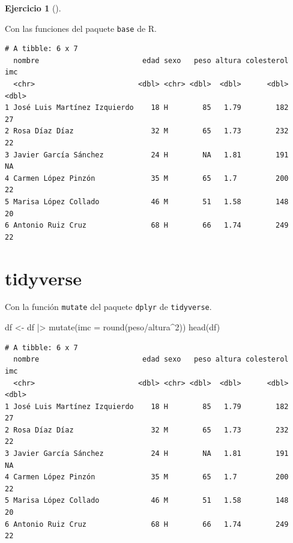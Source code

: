\documentclass[
  spanish,
  a4paper,
]{scrreport}
\newenvironment{Shaded}{\begin{snugshade}}{\end{snugshade}}
\newcommand{\AttributeTok}[1]{\textcolor[rgb]{0.40,0.45,0.13}{#1}}
\newcommand{\DecValTok}[1]{\textcolor[rgb]{0.68,0.00,0.00}{#1}}
\newcommand{\FunctionTok}[1]{\textcolor[rgb]{0.28,0.35,0.67}{#1}}
\newcommand{\NormalTok}[1]{\textcolor[rgb]{0.00,0.23,0.31}{#1}}
\newcommand{\OtherTok}[1]{\textcolor[rgb]{0.00,0.23,0.31}{#1}}
\newcommand{\SpecialCharTok}[1]{\textcolor[rgb]{0.37,0.37,0.37}{#1}}
\theoremstyle{definition}
\newtheorem{exercise}{Ejercicio}[chapter]
\theoremstyle{remark}
\begin{document}
\begin{exercise}[]
\begin{enumerate}
\begin{tcolorbox}
  Con las funciones del paquete \texttt{base} de R.

\begin{Shaded}
\end{Shaded}

\begin{verbatim}
# A tibble: 6 x 7
  nombre                        edad sexo   peso altura colesterol   imc
  <chr>                        <dbl> <chr> <dbl>  <dbl>      <dbl> <dbl>
1 José Luis Martínez Izquierdo    18 H        85   1.79        182    27
2 Rosa Díaz Díaz                  32 M        65   1.73        232    22
3 Javier García Sánchez           24 H        NA   1.81        191    NA
4 Carmen López Pinzón             35 M        65   1.7         200    22
5 Marisa López Collado            46 M        51   1.58        148    20
6 Antonio Ruiz Cruz               68 H        66   1.74        249    22
\end{verbatim}

  \section{tidyverse}

  Con la función \texttt{mutate} del paquete \texttt{dplyr} de
  \texttt{tidyverse}.

\begin{Shaded}
\begin{Highlighting}[]
\NormalTok{df }\OtherTok{\textless{}{-}}\NormalTok{ df }\SpecialCharTok{|\textgreater{}} \FunctionTok{mutate}\NormalTok{(}\AttributeTok{imc =} \FunctionTok{round}\NormalTok{(peso}\SpecialCharTok{/}\NormalTok{altura}\SpecialCharTok{\^{}}\DecValTok{2}\NormalTok{))}
\FunctionTok{head}\NormalTok{(df)}
\end{Highlighting}
\end{Shaded}

\begin{verbatim}
# A tibble: 6 x 7
  nombre                        edad sexo   peso altura colesterol   imc
  <chr>                        <dbl> <chr> <dbl>  <dbl>      <dbl> <dbl>
1 José Luis Martínez Izquierdo    18 H        85   1.79        182    27
2 Rosa Díaz Díaz                  32 M        65   1.73        232    22
3 Javier García Sánchez           24 H        NA   1.81        191    NA
4 Carmen López Pinzón             35 M        65   1.7         200    22
5 Marisa López Collado            46 M        51   1.58        148    20
6 Antonio Ruiz Cruz               68 H        66   1.74        249    22
\end{verbatim}


\end{tcolorbox}
\end{enumerate}
\end{exercise}
\end{document}
